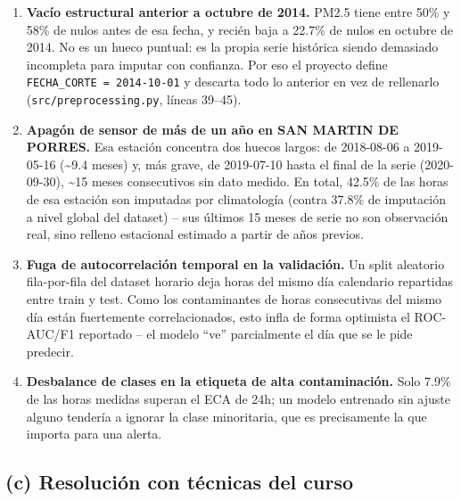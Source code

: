 \documentclass[11pt,a4paper]{article}
\begin{document}
\begin{enumerate}[leftmargin=1.5em]

\item \textbf{Vacío estructural anterior a octubre de 2014.} PM2.5 tiene entre 50\% y
58\% de nulos antes de esa fecha, y recién baja a 22.7\% de nulos en octubre de 2014.
No es un hueco puntual: es la propia serie histórica siendo demasiado incompleta para
imputar con confianza. Por eso el proyecto define \texttt{FECHA\_CORTE = 2014-10-01} y
descarta todo lo anterior en vez de rellenarlo (\texttt{src/\allowbreak preprocessing.py}, líneas
39--45).

\item \textbf{Apagón de sensor de más de un año en SAN MARTIN DE PORRES.} Esa estación
concentra dos huecos largos: de 2018-08-06 a 2019-05-16 (\textasciitilde 9.4 meses) y,
más grave, de 2019-07-10 hasta el final de la serie (2020-09-30), \textasciitilde 15
meses consecutivos sin dato medido. En total, 42.5\% de las horas de esa estación son
imputadas por climatología (contra 37.8\% de imputación a nivel global del dataset) --
sus últimos 15 meses de serie no son observación real, sino relleno estacional
estimado a partir de años previos.

\item \textbf{Fuga de autocorrelación temporal en la validación.} Un split
aleatorio fila-por-fila del dataset horario deja horas del mismo día calendario
repartidas entre train y test. Como los contaminantes de horas consecutivas del mismo
día están fuertemente correlacionados, esto infla de forma optimista el ROC-AUC/F1
reportado -- el modelo ``ve'' parcialmente el día que se le pide predecir.

\item \textbf{Desbalance de clases en la etiqueta de alta contaminación.} Solo 7.9\% de
las horas medidas superan el ECA de 24h; un modelo entrenado sin ajuste alguno tendería
a ignorar la clase minoritaria, que es precisamente la que importa para una alerta.

\end{enumerate}

\subsection*{(c) Resolución con técnicas del curso}
\end{document}
